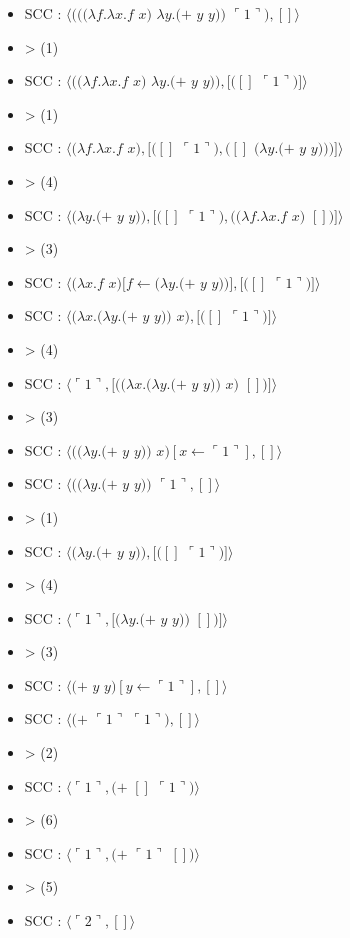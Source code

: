 \documentclass[10pt,a4paper]{report}
\begin{document}
\begin{multicols}{2}\raggedright{
    \begin{itemize}
    \item[] SCC : $\langle(((\lambda f.\lambda x.f$ $x)$ $\lambda y.(+$ $y$ $y))$ $\ulcorner 1\urcorner),[]\rangle$
    \item[] > (1)
    \item[] SCC : $\langle((\lambda f.\lambda x.f$ $x)$ $\lambda y.(+$ $y$ $y)),[([]$ $\ulcorner 1\urcorner)]\rangle$
    \item[] > (1)
    \item[] SCC : $\langle(\lambda f.\lambda x.f$ $x),[([]$ $\ulcorner 1\urcorner),([]$ $(\lambda y.(+$ $y$ $y)))]\rangle$
    \item[] > (4)
    \item[] SCC : $\langle(\lambda y.(+$ $y$ $y)),[([]$ $\ulcorner 1\urcorner),((\lambda f.\lambda x.f$ $x)$ $[])]\rangle$
    \item[] > (3) 
    \item[] SCC : $\langle(\lambda x.f$ $x)[f\leftarrow(\lambda y.(+$ $y$ $y))],[([]$ $\ulcorner 1\urcorner)]\rangle$
    \item[] SCC : $\langle(\lambda x.(\lambda y.(+$ $y$ $y))$ $x),[([]$ $\ulcorner 1\urcorner)]\rangle$
    \item[] > (4) 
    \item[] SCC : $\langle\ulcorner 1\urcorner,[((\lambda x.(\lambda y.(+$ $y$ $y))$ $x)$ $[])]\rangle$
    \item[] > (3) 
    \item[] SCC : $\langle((\lambda y.(+$ $y$ $y))$ $x)[x \leftarrow\ulcorner 1\urcorner],[]\rangle$
    \item[] SCC : $\langle((\lambda y.(+$ $y$ $y))$ $\ulcorner 1\urcorner,[]\rangle$
    \end{itemize}
    
    \begin{itemize}
    \item[] > (1) 
    \item[] SCC : $\langle(\lambda y.(+$ $y$ $y)),[([]$ $\ulcorner 1\urcorner)]\rangle$
    \item[] > (4)
    \item[] SCC : $\langle\ulcorner 1\urcorner,[(\lambda y.(+$ $y$ $y))$ $[])]\rangle$
    \item[] > (3) 
    \item[] SCC : $\langle(+$ $y$ $y)[y \leftarrow \ulcorner 1\urcorner],[]\rangle$	
    \item[] SCC : $\langle(+$ $\ulcorner 1\urcorner$ $\ulcorner 1\urcorner),[]\rangle$	
    \item[] > (2) 
    \item[] SCC : $\langle\ulcorner 1\urcorner,(+$ $[]$ $\ulcorner 1\urcorner)\rangle$	
    \item[] > (6) 
    \item[] SCC : $\langle\ulcorner 1\urcorner,(+$ $\ulcorner 1\urcorner$ $[])\rangle$	
    \item[] > (5)
    \item[] SCC : $\langle\ulcorner 2\urcorner,[]\rangle$	
    \end{itemize}
  }
\end{multicols}
\end{document}
